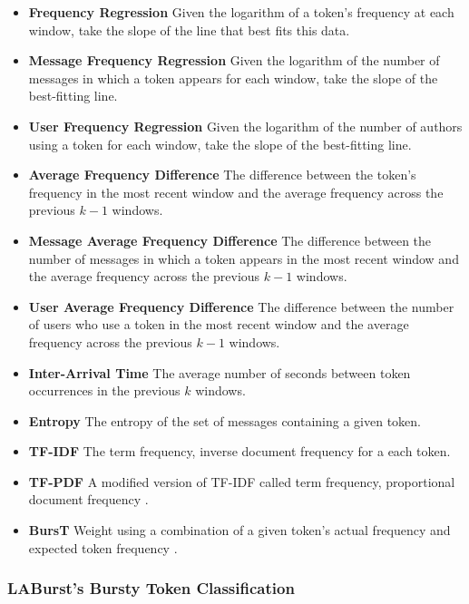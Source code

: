 \documentclass[letterpaper]{article}
\begin{document}
{
\small
\begin{itemize}
\item \textbf{Frequency Regression} Given the logarithm of a token's frequency at each window, take the slope of the line that best fits this data.
\item \textbf{Message Frequency Regression} Given the logarithm of the number of messages in which a token appears for each window, take the slope of the best-fitting line.
\item \textbf{User Frequency Regression} Given the logarithm of the number of authors using a token for each window, take the slope of the best-fitting line.
\item \textbf{Average Frequency Difference} The difference between the token's frequency in the most recent window and the average frequency across the previous $k -1$ windows.
\item \textbf{Message Average Frequency Difference} The difference between the number of messages in which a token appears in the most recent window and the average frequency across the previous $k -1$ windows.
\item \textbf{User Average Frequency Difference} The difference between the number of users who use a token in the most recent window and the average frequency across the previous $k -1$ windows.
\item \textbf{Inter-Arrival Time} The average number of seconds between token occurrences in the previous $k$ windows.
\item \textbf{Entropy} The entropy of the set of messages containing a given token.
\item \textbf{TF-IDF} The term frequency, inverse document frequency for a each token.
\item \textbf{TF-PDF} A modified version of TF-IDF called term frequency, proportional document frequency \cite{Bun:2002:TEN:645962.674082}.
\item \textbf{BursT} Weight using a combination of a given token's actual frequency and expected token frequency \cite{Lee:2011:BDT:2009463.2009531}.
\end{itemize}
}

\subsubsection{LABurst's Bursty Token Classification}
\end{document}
